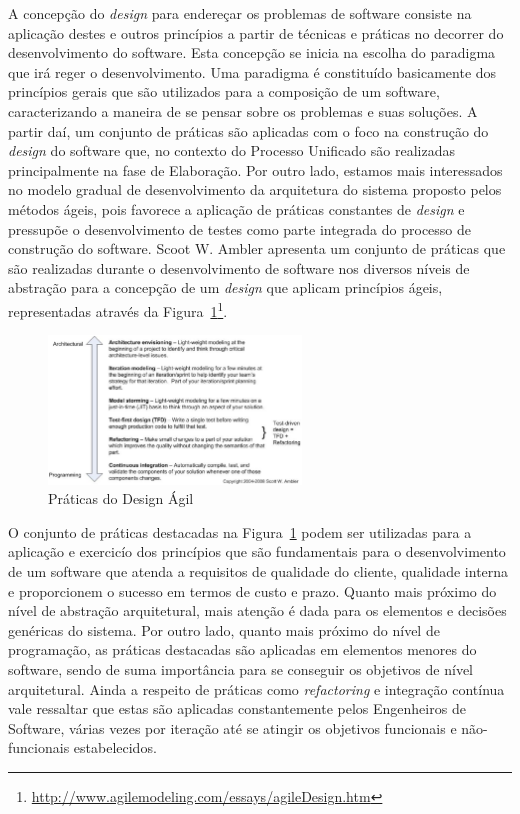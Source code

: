 %

A concepção do \emph{design} para endereçar os problemas de software consiste na aplicação destes e outros princípios a partir de técnicas e práticas no decorrer do desenvolvimento do software. Esta concepção se inicia na escolha do paradigma que irá reger o desenvolvimento. Uma paradigma é constituído basicamente dos princípios gerais que são utilizados para a composição de um software, caracterizando a maneira de se pensar sobre os problemas e suas soluções. A partir daí, um conjunto de práticas são aplicadas com o foco na construção do \emph{design} do software que, no contexto do Processo Unificado são realizadas principalmente na fase de Elaboração. Por outro lado, estamos mais interessados no modelo gradual de desenvolvimento da arquitetura do sistema proposto pelos métodos ágeis, pois favorece a aplicação de práticas constantes de \emph{design} e pressupõe o desenvolvimento de testes como parte integrada do processo de construção do software. Scoot W. Ambler apresenta um conjunto de práticas que são realizadas durante o desenvolvimento de software nos diversos níveis de abstração para a concepção de um \emph{design} que aplicam princípios ágeis, representadas através da Figura~\ref{fig:agile-design}\footnote{\url{http://www.agilemodeling.com/essays/agileDesign.htm}}.

%

\graphicspath{{figuras/}}
\begin{figure}[h]
\centering
\includegraphics[width=0.6\textwidth]{agile_design_practices.eps}
\caption{Práticas do Design Ágil}
\label{fig:agile-design}
\end{figure}

%

O conjunto de práticas destacadas na Figura~\ref{fig:agile-design} podem ser utilizadas para a aplicação e exercicío dos princípios que são fundamentais para o desenvolvimento de um software que atenda a requisitos de qualidade do cliente, qualidade interna e proporcionem o sucesso em termos de custo e prazo. Quanto mais próximo do nível de abstração arquitetural, mais atenção é dada para os elementos e decisões genéricas do sistema. Por outro lado, quanto mais próximo do nível de programação, as práticas destacadas são aplicadas em elementos menores do software, sendo de suma importância para se conseguir os objetivos de nível arquitetural. Ainda a respeito de práticas como \emph{refactoring} e integração contínua vale ressaltar que estas são aplicadas constantemente pelos Engenheiros de Software, várias vezes por iteração até se atingir os objetivos funcionais e não-funcionais estabelecidos.

